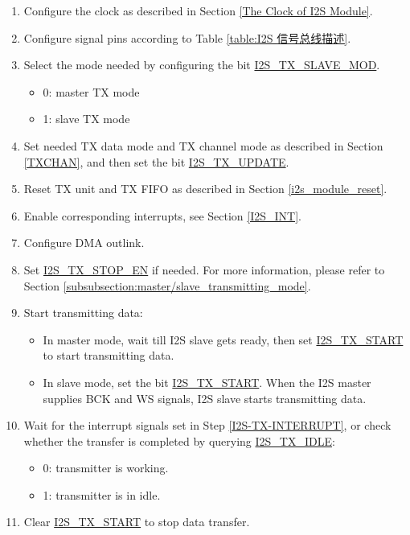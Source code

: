 \documentclass[main\_\_CN.tex]{subfiles}
\begin{document}
\begin{enumerate}
    \item Configure the clock as described in Section  \ref{The Clock of I2S Module}.

    \item Configure signal pins according to Table  \ref{table:I2S 信号总线描述}.

    \item Select the mode needed by configuring the bit  \hyperref[fielddesc:I2STXSLAVEMOD]{I2S\_TX\_SLAVE\_MOD}.
    \begin{itemize}
        \item 0: master TX mode
        \item 1: slave TX mode
    \end{itemize}

    \item Set needed TX data mode and TX channel mode as described in Section  \ref{TXCHAN}, and then set the bit  \hyperref[fielddesc:I2STXUPDATE]{I2S\_TX\_UPDATE}.

    \item Reset TX unit and TX FIFO as described in Section  \ref{i2s_module_reset}.
    \item Enable corresponding interrupts, see Section  \ref{I2S_INT}.\label{I2S-TX-INTERRUPT}
    \item Configure DMA outlink.

    \item Set  \hyperref[fielddesc:I2STXSTOPEN]{I2S\_TX\_STOP\_EN} if needed. For more information, please refer to Section  \ref{subsubsection:master/slave_transmitting_mode}.

    \item Start transmitting data:
    \begin{itemize}
        \item In master mode, wait till I2S slave gets ready, then set  \hyperref[fielddesc:I2STXSTART]{I2S\_TX\_START} to start transmitting data.
        \item In slave mode, set the bit  \hyperref[fielddesc:I2STXSTART]{I2S\_TX\_START}. When the I2S master supplies BCK and WS signals, I2S slave starts transmitting data.
    \end{itemize}

    \item Wait for the interrupt signals set in Step  \ref{I2S-TX-INTERRUPT}, or check whether the transfer is completed by querying  \hyperref[fielddesc:I2STXIDLE]{I2S\_TX\_IDLE}:
    \begin{itemize}
        \item 0: transmitter is working.
        \item 1: transmitter is in idle.
    \end{itemize}

    \item Clear  \hyperref[fielddesc:I2STXSTART]{I2S\_TX\_START} to stop data transfer.
\end{enumerate}
\end{document}
